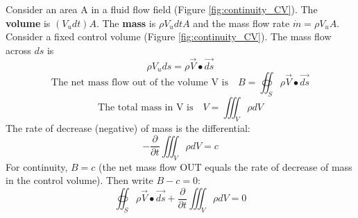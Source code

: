 \documentclass[draft=false, titlepage]{article}
\begin{document}
Consider an area A in a fluid flow field (Figure \ref{fig:continuity_CV}). The \textbf{volume} is $(V_udt) A$. The \textbf{mass} is $\rho V_u dt A$ and the mass flow rate $\dot{m} = \rho V_u A$.\\
Consider a fixed control volume (Figure \ref{fig:continuity_CV}). The mass flow across $ds$ is
\begin{equation*}
\rho V_u ds = \rho \vec{V} \bullet \vec{ds}
\end{equation*}
\begin{equation*}
    \text{The net mass flow out of the volume V is} \quad B=\oiint_S \rho \vec{V} \bullet \vec{ds}
\end{equation*}
\begin{equation*}
    \text{The total mass in V is} \quad V = \iiint_V \rho dV
\end{equation*}
The rate of decrease (negative) of mass is the differential:
\begin{equation*}
    -\frac{\partial}{\partial t} \iiint_V \rho dV = c
\end{equation*}
For continuity, $B=c$ (the net mass flow OUT equals the rate of decrease of mass in the control volume). Then write $B-c = 0$:
\begin{equation}
   \boxed{ \oiint_S \rho \vec{V} \bullet \vec{ds} +\frac{\partial}{\partial t} \iiint_V \rho dV = 0 }
\end{equation}
\end{document}
